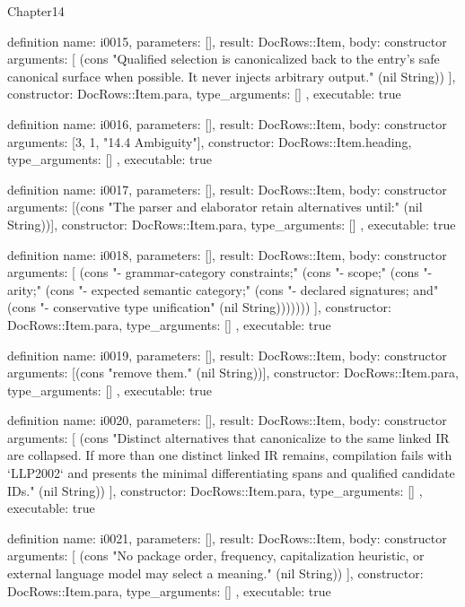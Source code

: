 \begin{lexlean}{Chapter14}
\begin{semanticmodule}
definition{
  name: i0015,
  parameters: [],
  result: DocRows::Item,
  body: constructor{
    arguments: [
      (cons "Qualified selection is canonicalized back to the entry's safe canonical surface when possible. It never injects arbitrary output." (nil String))
    ],
    constructor: DocRows::Item.para,
    type_arguments: []
  },
  executable: true
}

definition{
  name: i0016,
  parameters: [],
  result: DocRows::Item,
  body: constructor{
    arguments: [3, 1, "14.4 Ambiguity"],
    constructor: DocRows::Item.heading,
    type_arguments: []
  },
  executable: true
}

definition{
  name: i0017,
  parameters: [],
  result: DocRows::Item,
  body: constructor{
    arguments: [(cons "The parser and elaborator retain alternatives until:" (nil String))],
    constructor: DocRows::Item.para,
    type_arguments: []
  },
  executable: true
}

definition{
  name: i0018,
  parameters: [],
  result: DocRows::Item,
  body: constructor{
    arguments: [
      (cons "- grammar-category constraints;" (cons "- scope;" (cons "- arity;" (cons "- expected semantic category;" (cons "- declared signatures; and" (cons "- conservative type unification" (nil String)))))))
    ],
    constructor: DocRows::Item.para,
    type_arguments: []
  },
  executable: true
}

definition{
  name: i0019,
  parameters: [],
  result: DocRows::Item,
  body: constructor{
    arguments: [(cons "remove them." (nil String))],
    constructor: DocRows::Item.para,
    type_arguments: []
  },
  executable: true
}

definition{
  name: i0020,
  parameters: [],
  result: DocRows::Item,
  body: constructor{
    arguments: [
      (cons "Distinct alternatives that canonicalize to the same linked IR are collapsed. If more than one distinct linked IR remains, compilation fails with `LLP2002` and presents the minimal differentiating spans and qualified candidate IDs." (nil String))
    ],
    constructor: DocRows::Item.para,
    type_arguments: []
  },
  executable: true
}

definition{
  name: i0021,
  parameters: [],
  result: DocRows::Item,
  body: constructor{
    arguments: [
      (cons "No package order, frequency, capitalization heuristic, or external language model may select a meaning." (nil String))
    ],
    constructor: DocRows::Item.para,
    type_arguments: []
  },
  executable: true
}
\end{semanticmodule}
\end{lexlean}
